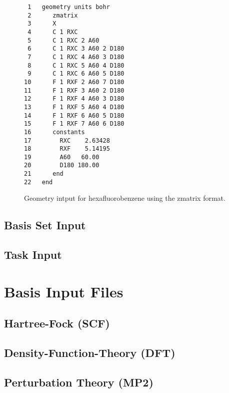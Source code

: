 \documentclass[letterpaper,12pt]{article}
\begin{document}
\begin{figure}
    \caption{Geometry intput for hexafluorobenzene using the zmatrix format.}
    \label{fig:HexafluorobenzeneZMatrix}
    \begin{verbatim}
 1   geometry units bohr
 2      zmatrix
 3      X
 4      C 1 RXC
 5      C 1 RXC 2 A60
 6      C 1 RXC 3 A60 2 D180
 7      C 1 RXC 4 A60 3 D180
 8      C 1 RXC 5 A60 4 D180
 9      C 1 RXC 6 A60 5 D180
10      F 1 RXF 2 A60 7 D180
11      F 1 RXF 3 A60 2 D180
12      F 1 RXF 4 A60 3 D180
13      F 1 RXF 5 A60 4 D180
14      F 1 RXF 6 A60 5 D180
15      F 1 RXF 7 A60 6 D180
16      constants
17        RXC    2.63428
18        RXF    5.14195
19        A60   60.00
20        D180 180.00
21      end
22   end
    \end{verbatim}
\end{figure}

\subsection{Basis Set Input}\label{sec:BasisSetInput}

\newpage

\subsection{Task Input}\label{sec:TaskInput}

\newpage

\section{Basis Input Files}\label{sec:BasisInputFiles}

\newpage

\subsection{Hartree-Fock (SCF)}\label{sec:HartreeFock}

\newpage

\subsection{Density-Function-Theory (DFT)}\label{sec:DensityFunctionTheory}

\newpage

\subsection{Perturbation Theory (MP2)}\label{sec:PerturbationTheory}
\end{document}
